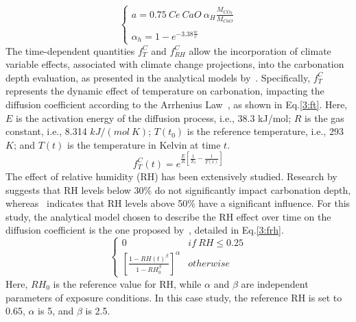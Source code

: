\begin{equation}
    \left\{
    \begin{array}{ll}
    a = 0.75 \ Ce \ CaO \ \alpha_H \frac{M_{CO_2}}{M_{CaO}} \\
      \\
      \alpha_h = 1 - e^{-3.38 \frac{w}{c}}
    \end{array}
    \right.
    \label{eq_a}
\end{equation}
The time-dependent quantities $f_T^C$ and $f_{RH}^C$ allow the incorporation of climate variable effects, associated with climate change projections, into the carbonation depth evaluation, as presented in the analytical models by~\textcite{Carbonation_BASTIDASARTEAGA}. 
Specifically, $f_T^C$ represents the dynamic effect of temperature on carbonation, impacting the diffusion coefficient according to the Arrhenius Law~\cite{Carbonation_YOON}, as shown in Eq.\ref{3:ft}. Here, $E$ is the activation energy of the diffusion process, i.e., 38.3 kJ/mol; $R$ is the gas constant, i.e., 8.314 $kJ/(mol \ K)$; $T(t_0)$ is the reference temperature, i.e., 293 $K$; and $T(t)$ is the temperature in Kelvin at time $t$.
\begin{equation}
    \label{3:ft}
        f_T^C (t) = e^{\frac{E}{R} \left[ \frac{1}{T_0} - \frac{1}{T(t)} \right]}
\end{equation}
The effect of relative humidity (RH) has been extensively studied. Research by~\textcite{f_rh_Al-Khaiat} suggests that RH levels below 30\% do not significantly impact carbonation depth, whereas~\textcite{f_rh_BARY} indicates that RH levels above 50\% have a significant influence. For this study, the analytical model chosen to describe the RH effect over time on the diffusion coefficient is the one proposed by~\textcite{Carbonation_BASTIDASARTEAGA}, detailed in Eq.\ref{3:frh}.
\begin{equation}
    \left\{
    \begin{array}{ll}
    0 & if \ RH \leq 0.25\\
    \left[\frac{1-RH(t)^\beta}{1-RH_0^\beta} \right]^\alpha & otherwise
    \end{array}
    \right.
    \label{3:frh}
\end{equation}
Here, $RH_0$ is the reference value for RH, while $\alpha$ and $\beta$ are independent parameters of exposure conditions. In this case study, the reference RH is set to 0.65, $\alpha$ is 5, and $\beta$ is 2.5.

